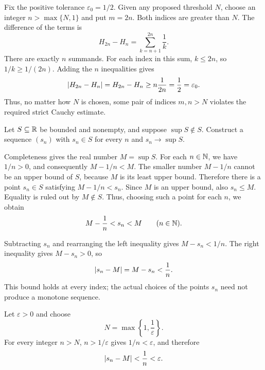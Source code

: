 Fix the positive tolerance $\varepsilon_0=1/2$. Given any proposed
threshold $N$, choose an integer $n>\max\{N,1\}$ and put $m=2n$.
Both indices are greater than $N$. The difference of the terms is
\[
 H_{2n}-H_n=\sum_{k=n+1}^{2n}\frac1k.
\]
There are exactly $n$ summands. For each index in this sum, $k\le2n$,
so $1/k\ge1/(2n)$. Adding the $n$ inequalities gives
\[
 \left|H_{2n}-H_n\right|=H_{2n}-H_n
   \ge n\frac1{2n}=\frac12=\varepsilon_0.
\]
Thus, no matter how $N$ is chosen, some pair of indices $m,n>N$
violates the required strict Cauchy estimate.



\goal Let $S\subseteq\mathbb{R}$ be bounded and nonempty, and suppose
$\sup S\notin S$. Construct a sequence $(s_n)$ with $s_n\in S$
for every $n$ and $s_n\to\sup S$.

Completeness gives the real number $M=\sup S$. For each $n\in\mathbb{N}$,
we have $1/n>0$, and consequently $M-1/n<M$.
The smaller number $M-1/n$ cannot be an upper bound of $S$,
because $M$ is its least upper bound. Therefore there is a point
$s_n\in S$ satisfying $M-1/n<s_n$.
Since $M$ is an upper bound, also $s_n\le M$. Equality is ruled out
by $M\notin S$. Thus, choosing such a point for each $n$, we obtain
\[
 M-\frac1n<s_n<M\qquad(n\in\mathbb{N}).
\]

Subtracting $s_n$ and rearranging the left inequality gives
$M-s_n<1/n$. The right inequality gives $M-s_n>0$, so
\[
 \left|s_n-M\right|=M-s_n<\frac1n.
\]
This bound holds at every index; the actual choices of the points
$s_n$ need not produce a monotone sequence.

Let $\varepsilon>0$ and choose
\[
 N=\max\left\{1,\frac1\varepsilon\right\}.
\]
For every integer $n>N$, $n>1/\varepsilon$ gives $1/n<\varepsilon$,
and therefore
\[
 \left|s_n-M\right|<\frac1n<\varepsilon.
\]


